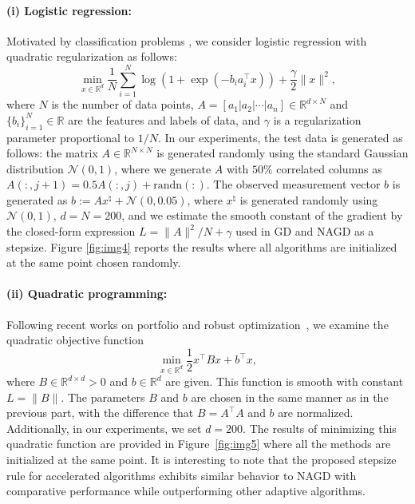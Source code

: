 \documentclass[11pt, a4paper, oneside, reqno]{amsart}
\begin{document}
\paragraph{{\bf (i) Logistic regression: }} Motivated by classification problems \cite{jiang2020online}, we consider logistic regression with quadratic regularization as follows:
\begin{equation}
\label{log-reg}
    \min_{x\in\mathbb{R}^d} \dfrac{1}{N} \sum_{i=1}^{N} \log \left(1+\exp(-b_i a_{i}^\top x)\right) + \dfrac{\gamma}{2} \|x\|^2,
\end{equation}
where $N$ is the number of data points, $A = [a_1|a_2|\cdots|a_n]\in \mathbb{R}^{d\times N}$ and $\{b_i\}_{i=1}^N \in \mathbb{R}$ are the features and labels of data, and $\gamma$ is a regularization parameter proportional to ${1}/{N}$. In our experiments, the test data is generated as follows: the matrix $A \in \mathbb{R}^{N\times N}$ is generated randomly using the standard Gaussian distribution $\mathcal{N}(0, 1)$, where we generate $A$ with $50\%$ correlated columns as $A(:,j+1) = 0.5A(:,j) + \textrm{randn}(:)$. The observed measurement vector $b$ is generated as $b := Ax^{\natural} + \mathcal{N}(0, 0.05)$, where $x^{\natural}$ is generated randomly using $\mathcal{N}(0, 1)$, $d = N = 200$, and we estimate the smooth constant of the gradient by the closed-form expression $L = \|A\|^2 / N + \gamma$ used in GD and NAGD as a stepsize. Figure \ref{fig:img4} reports the results where all algorithms are initialized at the same point chosen randomly.

\paragraph{{\bf (ii) Quadratic programming:}} Following recent works on portfolio and robust optimization~\cite{huang2025restarted, mittal2020robust}, we examine the quadratic objective function
\begin{equation}
\label{quad}
    \min_{x\in\mathbb{R}^d} \dfrac{1}{2}x^\top B x + b^\top x,
\end{equation}
where $B\in \mathbb{R}^{d\times d} > 0$ and $b\in \mathbb{R}^d$ are given. This function is smooth with constant $L = \|B\|$. The parameters $B$ and $b$ are chosen in the same manner as in the previous part, with the difference that $B = A^\top A$ and $b$ are normalized. Additionally, in our experiments, we set $d = 200$. The results of minimizing this quadratic function are provided in Figure~\ref{fig:img5} where all the methods are initialized at the same point. It is interesting to note that the proposed stepsize rule for accelerated algorithms exhibits similar behavior to NAGD with comparative performance while outperforming other adaptive algorithms.
\end{document}
